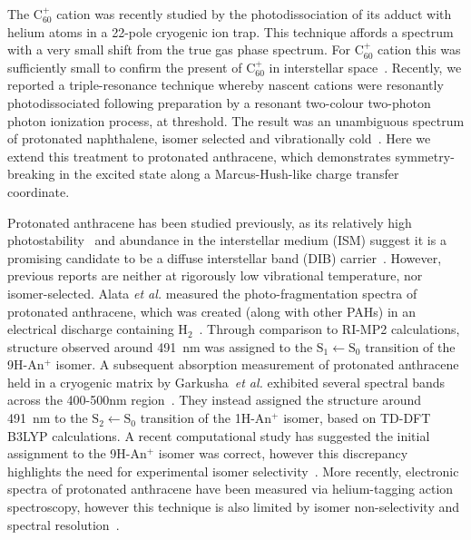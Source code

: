 \documentclass[journal=jpcafh,manuscript=article,layout=onecolumn, 12pt]{achemso}
\begin{document}
The C$_{60}^+$ cation was recently studied by the photodissociation of its adduct with helium atoms in a 22-pole cryogenic ion trap. This technique affords a spectrum with a very small shift from the true gas phase spectrum. For C$_{60}^+$ cation this was sufficiently small to confirm the present of C$_{60}^+$ in interstellar space~\cite{cam15}. Recently, we reported a triple-resonance technique whereby nascent cations were resonantly photodissociated following preparation by a resonant two-colour two-photon photon ionization process, at threshold. The result was an unambiguous spectrum of protonated naphthalene, isomer selected and vibrationally cold~\cite{kre13}. Here we extend this treatment to protonated anthracene, which demonstrates symmetry-breaking in the excited state along a Marcus-Hush-like charge transfer coordinate.




Protonated anthracene has been studied previously, as its relatively high photostability~\cite{joc99} and abundance in the interstellar medium (ISM) suggest it is a promising candidate to be a diffuse interstellar band (DIB) carrier~\cite{mey21,tie08,hud01,pat08}. However, previous reports are neither at rigorously low vibrational temperature, nor isomer-selected. Alata \emph{et al.} measured the photo-fragmentation spectra of protonated anthracene, which was created (along with other PAHs) in an electrical discharge containing H$_2$~\cite{ala10}. Through comparison to RI-MP2 calculations, structure observed around 491~nm was assigned to the $\text{S}_1\leftarrow \text{S}_0$ transition of the 9H-An$^+$ isomer. A subsequent absorption measurement of protonated anthracene held in a cryogenic matrix by Garkusha~\emph{et al.} exhibited several spectral bands across the 400-500nm region~\cite{gar11}. They instead assigned the structure around 491~nm to the $\text{S}_2\leftarrow \text{S}_0$ transition of the 1H-An$^+$ isomer, based on TD-DFT B3LYP calculations. A recent computational study has suggested the initial assignment to the 9H-An$^+$ isomer was correct, however this discrepancy highlights the need for experimental isomer selectivity~\cite{li21}. More recently, electronic spectra of protonated anthracene have been measured via helium-tagging action spectroscopy, however this technique is also limited by isomer non-selectivity and spectral resolution~\cite{mey21}.
\end{document}
